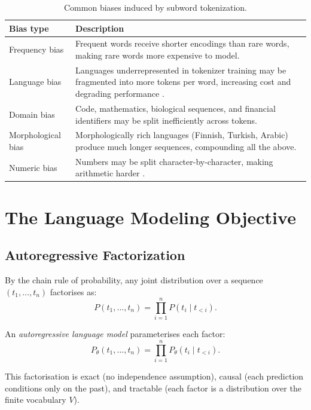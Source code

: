 \documentclass[11pt,a4paper]{article}
\theoremstyle{definition}
\theoremstyle{plain}
\begin{document}
\begin{table}[ht]
\centering
\small
\renewcommand{\arraystretch}{1.35}
\begin{tabularx}{\linewidth}{@{} l X @{}}
  \toprule
  \rowcolor{primary!15}
  \textbf{Bias type} & \textbf{Description} \\
  \midrule
  Frequency bias      & Frequent words receive shorter encodings than rare words, making rare words more expensive to model. \\
  Language bias       & Languages underrepresented in tokenizer training may be fragmented into more tokens per word, increasing cost and degrading performance \cite{rust2021good}. \\
  Domain bias         & Code, mathematics, biological sequences, and financial identifiers may be split inefficiently across tokens. \\
  Morphological bias  & Morphologically rich languages (Finnish, Turkish, Arabic) produce much longer sequences, compounding all the above. \\
  Numeric bias        & Numbers may be split character-by-character, making arithmetic harder \cite{nogueira2021investigating}. \\
  \bottomrule
\end{tabularx}
\caption{Common biases induced by subword tokenization.}
\label{tab:tokenization-biases}
\end{table}

\section{The Language Modeling Objective}

\subsection{Autoregressive Factorization}

By the chain rule of probability, any joint distribution over a sequence
$(t_1, \dots, t_n)$ factorises as:
\[
  P(t_1, \dots, t_n)
  = \prod_{i=1}^{n} P(t_i \mid t_{<i}).
\]

An \textit{autoregressive language model} parameterises each factor:
\[
  P_\theta(t_1, \dots, t_n)
  = \prod_{i=1}^{n} P_\theta(t_i \mid t_{<i}).
\]

This factorisation is exact (no independence assumption), causal (each prediction
conditions only on the past), and tractable (each factor is a distribution over
the finite vocabulary $V$).
\end{document}
